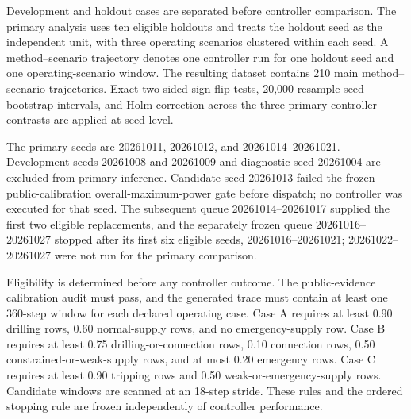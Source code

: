 Development and holdout cases are separated before controller comparison. The
primary analysis uses ten eligible holdouts and treats the holdout seed as the
independent unit, with three operating scenarios clustered within each seed.
A method--scenario trajectory denotes one controller run for one holdout seed
and one operating-scenario window. The resulting dataset contains 210 main
method--scenario trajectories. Exact
two-sided sign-flip tests, 20,000-resample seed bootstrap intervals, and Holm
correction across the three primary controller contrasts are applied at seed
level.

The primary seeds are 20261011, 20261012, and 20261014--20261021. Development
seeds 20261008 and 20261009 and diagnostic seed 20261004 are excluded from
primary inference. Candidate seed 20261013 failed the frozen public-calibration
overall-maximum-power gate before dispatch; no controller was executed for that
seed. The subsequent queue 20261014--20261017 supplied the first two eligible
replacements, and the separately frozen queue 20261016--20261027 stopped after
its first six eligible seeds, 20261016--20261021; 20261022--20261027 were not
run for the primary comparison.

Eligibility is determined before any controller outcome. The public-evidence
calibration audit must pass, and the generated trace must contain at least one
360-step window for each declared operating case. Case A requires at least
0.90 drilling rows, 0.60 normal-supply rows, and no emergency-supply row. Case B
requires at least 0.75 drilling-or-connection rows, 0.10 connection rows, 0.50
constrained-or-weak-supply rows, and at most 0.20 emergency rows. Case C requires
at least 0.90 tripping rows and 0.50 weak-or-emergency-supply rows. Candidate
windows are scanned at an 18-step stride. These rules and the ordered stopping
rule are frozen independently of controller performance.

